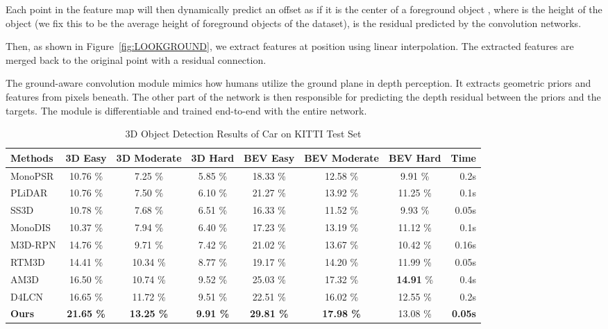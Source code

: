 \documentclass[letterpaper, 10 pt, journal, twoside]{IEEEtran}
\begin{document}
Each point  in the feature map will then dynamically predict an offset  as if it is the center of a foreground object
, where  is the height of the object (we fix this to be the average height of foreground objects of the dataset),  is the residual predicted by the convolution networks. 

Then, as shown in Figure~\ref{fig:LOOKGROUND}, we extract features  at position  using linear interpolation. The extracted features  are merged back to the original point  with a residual connection.

The ground-aware convolution module mimics how humans utilize the ground plane in depth perception. It extracts geometric priors and features from pixels beneath. The other part of the network is then responsible for predicting the depth residual between the priors and the targets. The module is differentiable and trained end-to-end with the entire network.


\begin{table*}[h]
    \centering
    \caption{3D Object Detection Results of Car on KITTI Test Set}
    
    \begin{tabular*}{0.8\textwidth}{ l|c|c|c|c|c|c|r}
        \toprule
        {\bf Methods} & {\bf 3D Easy} & {\bf 3D Moderate} & {\bf 3D Hard} & {\bf BEV Easy} & {\bf BEV Moderate} & {\bf BEV Hard} & {\bf Time}  \\ 
        \midrule
        MonoPSR\cite{Ku2019MonoPSR}      & 10.76 \% & 7.25 \% & 5.85 \% & 18.33 \% & 12.58 \% & 9.91 \% & 0.2s\\
        PLiDAR\cite{Weng2019Plidar}       & 10.76 \% & 7.50 \% & 6.10 \% & 21.27 \% & 13.92 \% & 11.25 \% & 0.1s\\
        SS3D\cite{Jorgensen2019SS3D}          & 10.78 \% & 7.68 \% & 6.51 \% & 16.33 \% & 11.52 \% & 9.93 \% & 0.05s\\
        MonoDIS\cite{Simonelli2019MonoDIS}      & 10.37 \% & 7.94 \% & 6.40 \% & 17.23 \% & 13.19 \% & 11.12 \% & 0.1s\\
        M3D-RPN\cite{Brazil2019M3DRPN}      & 14.76 \% & 9.71 \% & 7.42 \% & 21.02 \% & 13.67 \% & 10.42 \% & 0.16s\\
        RTM3D\cite{Li2020RTM3DRM}        & 14.41 \% & 10.34 \% & 8.77 \% & 19.17 \% & 14.20 \% & 11.99 \% & 0.05s\\
        AM3D\cite{Ma2019AM3D}         & 16.50 \% & 10.74 \% & 9.52 \% & 25.03 \% & 17.32 \% & \textbf{14.91} \% & 0.4s\\
        D4LCN\cite{Ding2019D4LCN}        & 16.65 \% & 11.72 \% & 9.51 \% & 22.51 \% & 16.02 \% & 12.55 \% & 0.2s\\
\textbf{Ours}  & \textbf{21.65 \%} & \textbf{13.25 \%} & \textbf{9.91 \%} & \textbf{29.81 \%} & \textbf{17.98 \%} & 13.08 \% & \textbf{0.05s}\\
        \bottomrule
    \end{tabular*} \label{tab:test_results}
\end{table*}
\end{document}
